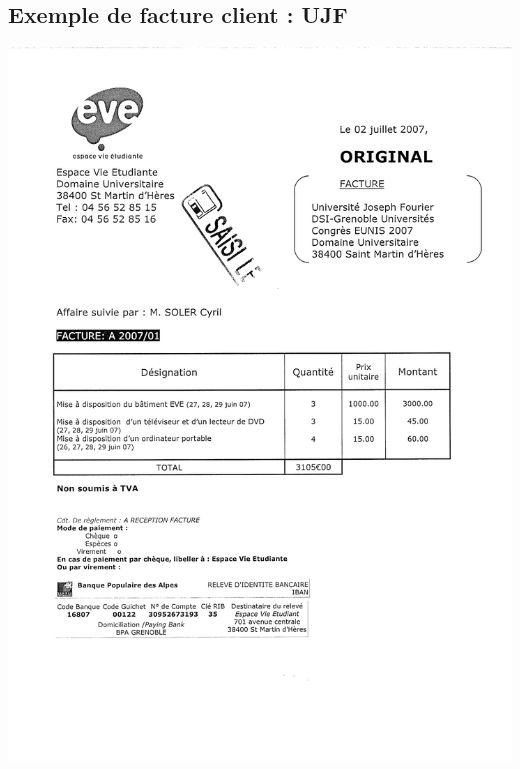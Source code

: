 \subsection{Exemple de facture client : UJF}
\begin{center}
\includegraphics[scale=0.7]{annexes/images/facture_client_mise_a_disposition.pdf}
\end{center}

